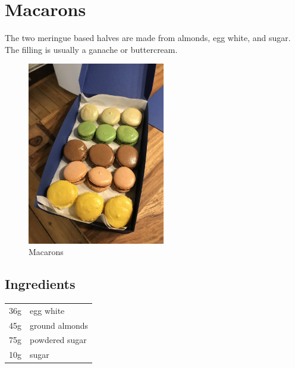 \section{Macarons}
The two meringue based halves are made from almonds, egg white, and sugar. The filling is usually a ganache or buttercream.

\begin{figure}[!htb]
    \begin{center}
    \includegraphics[width=6cm]{Pictures/Desserts/macarons_1.jpg}
    \caption[Macarons]{Macarons}
    \label{fig:macarons}
    \end{center}
\end{figure}
\subsection*{Ingredients}
\begin{tabular}{ l l }
  36g & egg white \\
  45g & ground almonds \\
  75g & powdered sugar \\
  10g & sugar \\
\end{tabular}

